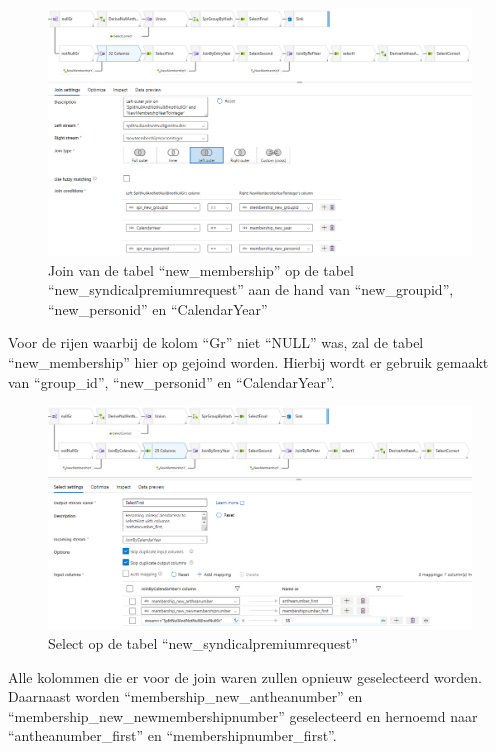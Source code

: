 \begin{figure}[H]
    \centering
    \includegraphics[width=1\textwidth]{./graphics/adf/member_3.png}
    \caption{Join van de tabel ``new\_membership'' op de tabel ``new\_syndicalpremiumrequest'' aan de hand van ``new\_groupid'', ``new\_personid'' en ``CalendarYear''}
\end{figure}

Voor de rijen waarbij de kolom ``Gr'' niet ``NULL'' was, zal de tabel ``new\_membership'' hier op gejoind worden. Hierbij wordt er gebruik gemaakt van ``group\_id'', ``new\_personid'' en ``CalendarYear''.

\begin{figure}[H]
    \centering
    \includegraphics[width=1\textwidth]{./graphics/adf/member_4.png}
    \caption{Select op de tabel ``new\_syndicalpremiumrequest''}
\end{figure}

Alle kolommen die er voor de join waren zullen opnieuw geselecteerd worden. Daarnaast worden ``membership\_new\_antheanumber'' en ``membership\_new\_newmembershipnumber'' geselecteerd en hernoemd naar ``antheanumber\_first'' en ``membershipnumber\_first''.

